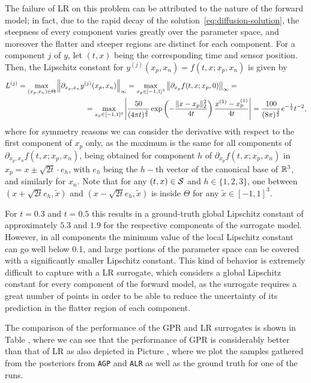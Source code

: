 The failure of LR on this problem can be attributed to the nature of the forward model; in fact, due to the rapid decay of the solution~\eqref{eq:diffusion-solution}, the steepness of every component varies greatly over the parameter space, and moreover the flatter and steeper regions are distinct for each component.
For a component $j$ of $y$, let $(t,x)$ being the corresponding time and sensor position.
Then, the Lipschitz constant for $y^{(j)}(x_p,x_n) = f(t,x;x_p,x_n)$ is given by 
\begin{align*}
    L^{(j)} = \max_{(x_p,x_n)\in\Theta}& \left\| \partial_{x_p,  x_n} y^{(j)}(x_p,x_n) \right\|_\infty  =
    \max_{x_p\in[-1,1]^3} \left\| \partial_{x_p} f(t,x;x_p,0) \right\|_\infty  =\\
    &\qquad \qquad= \max_{x_p\in [-1,1]^3} \left| \frac{50}{(4 \pi t)^{\frac{3}{2}}}\exp \left( - \frac{\lVert x-x_p\rVert_2^2}{4t}\right) \frac{x^{(1)}-x_p^{(1)}}{4t} \right| 
    = \frac{100}{(8\pi)^{\frac{3}{2}}} e^{-\frac{1}{2}} t^{-2},
\end{align*}
where for symmetry reasons we can consider the derivative with respect to the first component of $x_p$ only, as the maximum is the same for all components of $\partial_{x_p, x_n} f(t,x;x_p,x_n)$, being obtained for component $h$ of $\partial_{x_p} f(t,x;x_p,x_n)$ in $x_p = x \pm \sqrt{2t} \cdot e_h$, with $e_h$ being the $h-$th vector of the canonical base of $\mathbb{R}^3$, and similarly for $x_n$.
Note that for any $(t,x) \in \mathcal S$ and $h \in \{1,2,3\}$, one between $(x + \sqrt{2t} e_h, \tilde x)$ and $(x - \sqrt{2t} e_h, \tilde x)$ is inside $\Theta$ for any $\tilde x \in [-1,1]^3$.

For $t=0.3$ and $t=0.5$ this results in a ground-truth global Lipschitz constant of approximately $ 5.3$ and $1.9$ for the respective components of the surrogate model.
However, in all components the minimum value of the local Lipschitz constant can go well below 0.1, and large portions of the parameter space can be covered with a significantly smaller Lipschitz constant.
This kind of behavior is extremely difficult to capture with a LR surrogate, which considers a global Lipschitz constant for every component of the forward model, as the surrogate requires a great number of points in order to be able to reduce the uncertainty of its prediction in the flatter region of each component.

The comparison of the performance of the GPR and LR surrogates is shown in Table , where we can see that the performance of GPR is considerably better than that of LR as also depicted in Picture , where we plot the samples gathered from the posteriors from \texttt{AGP} and \texttt{ALR} as well as the ground truth for one of the runs.


